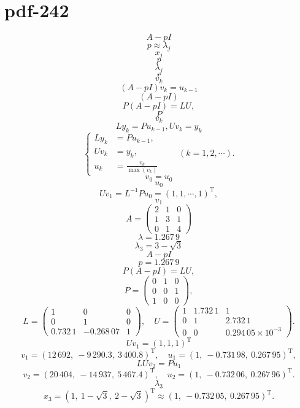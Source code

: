 \documentclass[fontset=fandol]{ctexart}
\begin{document}
\section*{pdf-242}
\[
A-pI
\]
\[
p\approx\lambda_j
\]
\[
x_j
\]
\[
p
\]
\[
\lambda_j
\]
\[
r
\]
\[
v_k
\]
\[
(A-pI)v_k=u_{k-1}
\]
\[
(A-pI)
\]
\[
P(A-pI)=LU,
\]
\[
P
\]
\[
v_k
\]
\[
Ly_k=Pu_{k-1},Uv_k=y_k
\]
\[
\left\{
\begin{aligned}
Ly_k&=Pu_{k-1},\\
Uv_k&=y_k,\\
u_k&=\frac{v_k}{\max(v_k)}
\end{aligned}
\right.\qquad(k=1,2,\cdots).
\tag{9.2.13}
\]
\[
v_0=u_0
\]
\[
u_0
\]
\[
Uv_1=L^{-1}Pu_0=(1,1,\cdots,1)^{\mathrm T},
\tag{9.2.14}
\]
\[
v_1
\]
\[
A=\begin{pmatrix}
2&1&0\\
1&3&1\\
0&1&4
\end{pmatrix}
\]
\[
\lambda=1.267\,9
\]
\[
\lambda_3=3-\sqrt3
\]
\[
A-pI
\]
\[
p=1.267\,9
\]
\[
P(A-pI)=LU,
\]
\[
P=\begin{pmatrix}
0&1&0\\
0&0&1\\
1&0&0
\end{pmatrix},
\]
\[
L=\begin{pmatrix}
1&0&0\\
0&1&0\\
0.732\,1&-0.268\,07&1
\end{pmatrix},\quad
U=\begin{pmatrix}
1&1.732\,1&1\\
0&1&2.732\,1\\
0&0&0.294\,05\times10^{-3}
\end{pmatrix}.
\]
\[
Uv_1=(1,1,1)^{\mathrm T}
\]
\[
v_1=(12\,692,\ -9\,290.3,\ 3\,400.8)^{\mathrm T},\quad
u_1=(1,\ -0.731\,98,\ 0.267\,95)^{\mathrm T},
\]
\[
LUv_2=Pu_1
\]
\[
v_2=(20\,404,\ -14\,937,\ 5\,467.4)^{\mathrm T},\quad
u_2=(1,\ -0.732\,06,\ 0.267\,96)^{\mathrm T}.
\]
\[
\lambda_3
\]
\[
x_3=(1,\ 1-\sqrt3,\ 2-\sqrt3)^{\mathrm T}\approx(1,\ -0.732\,05,\ 0.267\,95)^{\mathrm T}.
\]
\end{document}
